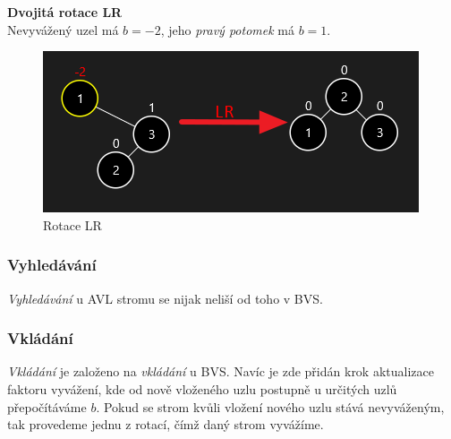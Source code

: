 \documentclass[
  biblatex=false,
  font=serif,
  glossaries=false,
  tables=false,
  theorems=false,
  index
]{kidiplom}
\begin{document}
\noindent\textbf{Dvojitá rotace LR}\\
\noindent Nevyvážený uzel má $b = -2$, jeho \textit{pravý potomek} má $b = 1$.
\begin{figure}[h!]
\centering
	\includegraphics[scale=0.8]{obrazky/14LR.png}
	\caption{Rotace LR}
\end{figure}

\subsubsection{Vyhledávání}
\indent\indent \textit{Vyhledávání} u AVL stromu se nijak neliší od toho v BVS.

\subsubsection{Vkládání}
\indent\indent \textit{Vkládání} je založeno na \textit{vkládání} u BVS. Navíc je zde přidán krok aktualizace faktoru vyvážení, kde od nově vloženého uzlu postupně u určitých uzlů přepočítáváme $b$. Pokud se strom kvůli vložení nového uzlu stává nevyváženým, tak provedeme jednu z rotací, čímž daný strom vyvážíme.\\
\end{document}
